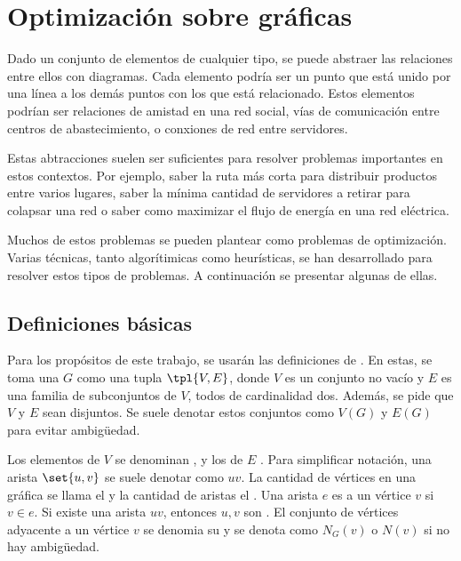 \chapter{Optimización sobre gráficas}
\label{app:graphs}

Dado un conjunto de elementos de cualquier tipo, se puede abstraer las
relaciones entre ellos con diagramas. Cada elemento podría ser un punto que está
unido por una línea a los demás puntos con los que está relacionado. Estos
elementos podrían ser relaciones de amistad en una red social, vías de
comunicación entre centros de abastecimiento, o conxiones de red entre
servidores.

Estas abtracciones suelen ser suficientes para resolver problemas importantes
en estos contextos. Por ejemplo, saber la ruta más corta para distribuir
productos entre varios lugares, saber la mínima cantidad de servidores a retirar
para colapsar una red o saber como maximizar el flujo de energía en una red
eléctrica.

Muchos de estos problemas se pueden plantear como problemas de optimización.
Varias técnicas, tanto algorítimicas como heurísticas, se han desarrollado para
resolver estos tipos de problemas. A continuación se presentar algunas de ellas.

\section{Definiciones básicas}

Para los propósitos de este trabajo, se usarán las definiciones de
\cite{Diestel2017}. En estas, se toma una  $G$ como una tupla
$\tpl{V, E}$, donde $V$ es un conjunto no vacío y $E$ es una familia de
subconjuntos de $V$, todos de cardinalidad dos. Además, se pide que $V$ y $E$
sean disjuntos. Se suele denotar estos conjuntos como $V(G)$ y $E(G)$ para
evitar ambigüedad.

Los elementos de $V$ se denominan , y los de $E$ .
Para simplificar notación, una arista $\set{u, v}$ se suele denotar como $uv$.
La cantidad de vértices en una gráfica se llama el  y la cantidad de
aristas el . Una arista $e$ es  a un vértice $v$ si
$v \in e$. Si existe una arista $uv$, entonces $u, v$ son . El
conjunto de vértices adyacente a un vértice $v$ se denomia su  y
se denota como $N_{G}(v)$ o $N(v)$ si no hay ambigüedad.

